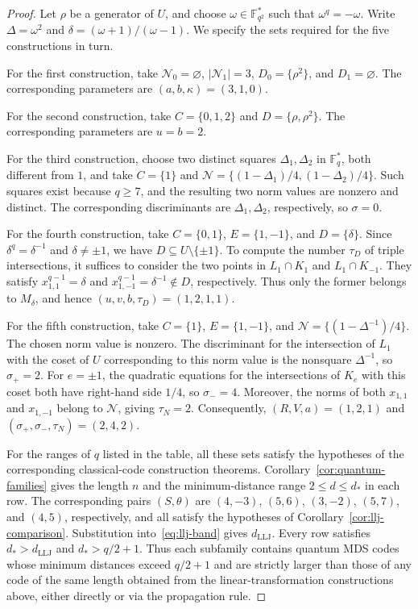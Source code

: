 \documentclass[preprint,12pt,a4paper]{elsarticle}
\begin{document}
\begin{proof}
Let $\rho$ be a generator of $U$, and choose $\omega\in\mathbb F_{q^2}^{*}$ such that $\omega^q=-\omega$. Write $\Delta=\omega^2$ and $\delta=(\omega+1)/(\omega-1)$. We specify the sets required for the five constructions in turn.

For the first construction, take $\mathcal N_0=\varnothing$, $|\mathcal N_1|=3$, $D_0=\{\rho^2\}$, and $D_1=\varnothing$. The corresponding parameters are $(a,b,\kappa)=(3,1,0)$.

For the second construction, take $C=\{0,1,2\}$ and $D=\{\rho,\rho^2\}$. The corresponding parameters are $u=b=2$.

For the third construction, choose two distinct squares $\Delta_1,\Delta_2$ in $\mathbb F_q^{*}$, both different from $1$, and take $C=\{1\}$ and $\mathcal N=\{(1-\Delta_1)/4,(1-\Delta_2)/4\}$. Such squares exist because $q\ge7$, and the resulting two norm values are nonzero and distinct. The corresponding discriminants are $\Delta_1,\Delta_2$, respectively, so $\sigma=0$.

For the fourth construction, take $C=\{0,1\}$, $E=\{1,-1\}$, and $D=\{\delta\}$. Since $\delta^q=\delta^{-1}$ and $\delta\ne\pm1$, we have $D\subseteq U\setminus\{\pm1\}$. To compute the number $\tau_D$ of triple intersections, it suffices to consider the two points in $L_1\cap K_1$ and $L_1\cap K_{-1}$. They satisfy $x_{1,1}^{q-1}=\delta$ and $x_{1,-1}^{q-1}=\delta^{-1}\notin D$, respectively. Thus only the former belongs to $M_\delta$, and hence $(u,v,b,\tau_D)=(1,2,1,1)$.

For the fifth construction, take $C=\{1\}$, $E=\{1,-1\}$, and $\mathcal N=\{(1-\Delta^{-1})/4\}$. The chosen norm value is nonzero. The discriminant for the intersection of $L_1$ with the coset of $U$ corresponding to this norm value is the nonsquare $\Delta^{-1}$, so $\sigma_+=2$. For $e=\pm1$, the quadratic equations for the intersections of $K_e$ with this coset both have right-hand side $1/4$, so $\sigma_-=4$. Moreover, the norms of both $x_{1,1}$ and $x_{1,-1}$ belong to $\mathcal N$, giving $\tau_N=2$. Consequently, $(R,V,a)=(1,2,1)$ and $(\sigma_+,\sigma_-,\tau_N)=(2,4,2)$.

For the ranges of $q$ listed in the table, all these sets satisfy the hypotheses of the corresponding classical-code construction theorems. Corollary~\ref{cor:quantum-families} gives the length $n$ and the minimum-distance range $2\le d\le d_*$ in each row. The corresponding pairs $(S,\theta)$ are $(4,-3)$, $(5,6)$, $(3,-2)$, $(5,7)$, and $(4,5)$, respectively, and all satisfy the hypotheses of Corollary~\ref{cor:llj-comparison}. Substitution into~\eqref{eq:llj-band} gives $d_{\mathrm{LLJ}}$. Every row satisfies $d_*>d_{\mathrm{LLJ}}$ and $d_*>q/2+1$. Thus each subfamily contains quantum MDS codes whose minimum distances exceed $q/2+1$ and are strictly larger than those of any code of the same length obtained from the linear-transformation constructions above, either directly or via the propagation rule.
\end{proof}
\end{document}
